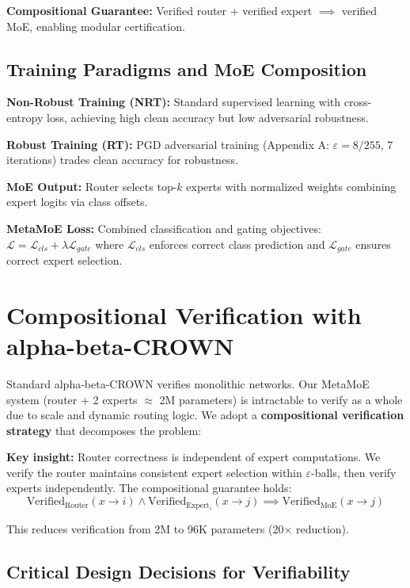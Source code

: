 \documentclass[11pt,a4paper]{article}
\begin{document}
\textbf{Compositional Guarantee:} Verified router + verified expert $\implies$ verified MoE, enabling modular certification.

\subsection{Training Paradigms and MoE Composition}

\textbf{Non-Robust Training (NRT):} Standard supervised learning with cross-entropy loss, achieving high clean accuracy but low adversarial robustness.

\textbf{Robust Training (RT):} PGD adversarial training (Appendix A: $\varepsilon = 8/255$, 7 iterations) trades clean accuracy for robustness.

\textbf{MoE Output:} Router selects top-$k$ experts with normalized weights combining expert logits via class offsets.

\textbf{MetaMoE Loss:} Combined classification and gating objectives: $\mathcal{L} = \mathcal{L}_{cls} + \lambda \mathcal{L}_{gate}$ where $\mathcal{L}_{cls}$ enforces correct class prediction and $\mathcal{L}_{gate}$ ensures correct expert selection.

\section{Compositional Verification with alpha-beta-CROWN}

Standard alpha-beta-CROWN verifies monolithic networks. Our MetaMoE system (router + 2 experts $\approx$ 2M parameters) is intractable to verify as a whole due to scale and dynamic routing logic. We adopt a \textbf{compositional verification strategy} that decomposes the problem:

\textbf{Key insight:} Router correctness is independent of expert computations. We verify the router maintains consistent expert selection within $\varepsilon$-balls, then verify experts independently. The compositional guarantee holds:
\begin{equation}
\text{Verified}_{\text{Router}}(x \to i) \land \text{Verified}_{\text{Expert}_i}(x \to j) \implies \text{Verified}_{\text{MoE}}(x \to j)
\end{equation}

This reduces verification from 2M to 96K parameters (20$\times$ reduction).

\subsection{Critical Design Decisions for Verifiability}
\end{document}
